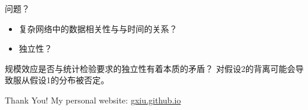 \documentclass{beamer}
\begin{document}
\begin{frame}{问题？}
    \begin{itemize}
        \item 复杂网络中的数据相关性与与时间的关系？
        \item 独立性？
    \end{itemize}
    \vspace{1cm}
    规模效应是否与统计检验要求的独立性有着本质的矛盾？
    对假设2的背离可能会导致服从假设1的分布被否定。
\end{frame}



\begin{frame}{Thank You!}
    My personal website: \url{gxiu.github.io}
\end{frame}
\end{document}
